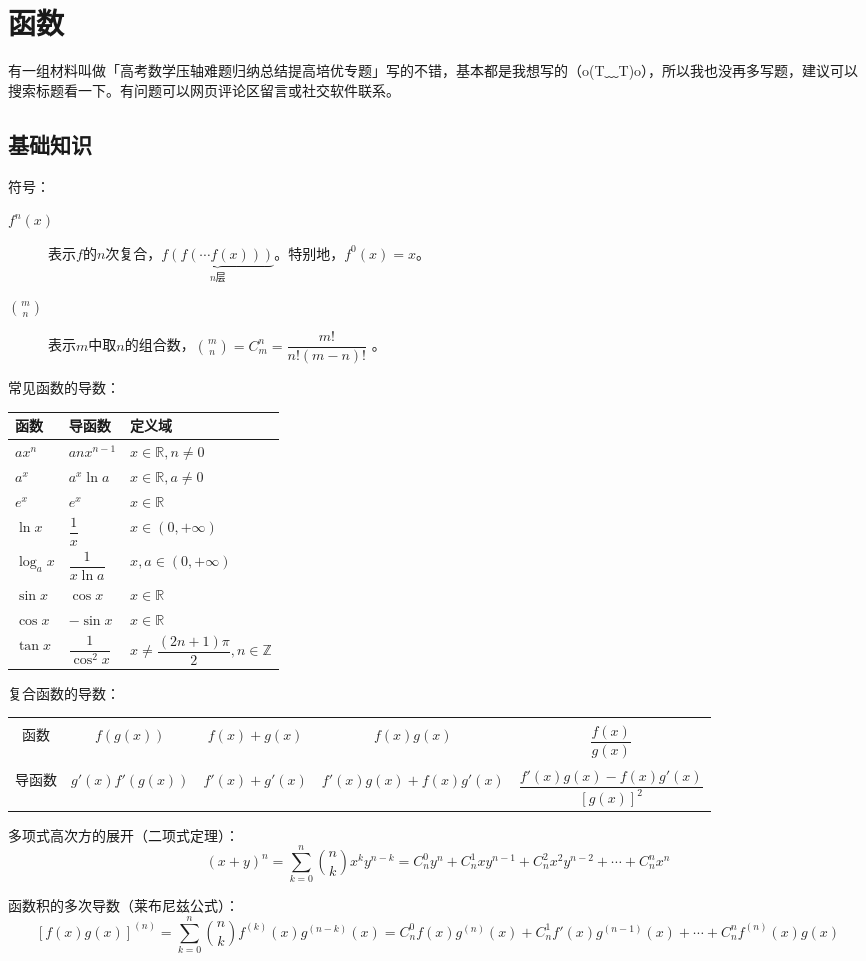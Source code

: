 \setchapterpreamble[u]{\margintoc}
\chapter{函数}
\begin{kaobox}[frametitle=Hint]
	有一组材料叫做「高考数学压轴难题归纳总结提高培优专题」写的不错，基本都是我想写的（o(T﹏T)o），所以我也没再多写题，建议可以搜索标题看一下。有问题可以网页评论区留言或社交软件联系。
\end{kaobox}
\section{基础知识}
符号：
\begin{description}
	\item[$f^n(x)$] 表示$f$的$n$次复合，$\underbrace{f(f(\cdots f(x)))}_{n\text{层}}$。特别地，$f^0(x)=x$。 
	\item[$\displaystyle\binom{m}{n}$] 表示$m$中取$n$的组合数，$\displaystyle\binom{m}{n}=C_m^n=\dfrac{m!}{n!(m-n)!}$ 。
\end{description}
常见函数的导数：\\
\begin{center}
	\begin{tabular}{lll}
		\hline
		函数&导函数&定义域\\
		\hline
		$ax^n$&$anx^{n-1}$&$x\in\mathbb{R},n\neq 0$\\
		$a^x$&$a^x\ln a$&$x \in \mathbb{R},a\neq 0$\\
		$e^x$&$e^x$&$x \in \mathbb{R}$\\
		$\ln x$&$\dfrac{1}{x}$&$x \in (0,+\infty)$\\
		$\log_a{x}$&$\dfrac{1}{x\ln a}$&$x,a \in (0,+\infty)$\\
		$\sin x$&$\cos x$&$x\in \mathbb{R}$\\
		$\cos x$&$-\sin x$&$x\in \mathbb{R}$\\
		$\tan x$&$\dfrac{1}{\cos^2 x}$&$x \neq \dfrac{(2n+1)\pi}{2}, n \in \mathbb{Z}$\\[0.5em]
		\hline
	\end{tabular} 
\end{center}
复合函数的导数：\par\vspace{1em}
\begin{tabular}{ccccc}
	\hline\\[-1em]
	函数&$f(g(x))$&$f(x)+g(x)$&$f(x)g(x)$&$\dfrac{f(x)}{g(x)}$\\[1em]
	\hline\\[-1em]
	导函数&$g'(x)f'(g(x))$&$f'(x)+g'(x)$&$f'(x)g(x)+f(x)g'(x)$&$\dfrac{f'(x)g(x)-f(x)g'(x)}{[g(x)]^2}$\\[1em]
	\hline
\end{tabular}\par\vspace{1em}
多项式高次方的展开（二项式定理）：
$$(x+y)^n=\sum_{k=0}^n\binom{n}{k}x^ky^{n-k}=C_n^0y^n+C_n^{1}xy^{n-1}+C_n^2x^2y^{n-2}+\cdots+C_n^nx^n$$
\par
函数积的多次导数（莱布尼兹公式）：
$$\left[f(x)g(x)\right]^{(n)}=\sum_{k=0}^n \binom{n}{k} f^{(k)}(x)g^{(n-k)}(x)=C_n^0f(x)g^{(n)}(x)+C_n^1f'(x)g^{(n-1)}(x)+\cdots+C_n^nf^{(n)}(x)g(x)$$
